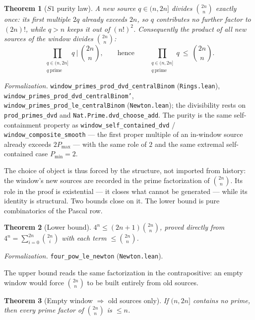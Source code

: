 \documentclass[11pt,a4paper]{amsart}
\theoremstyle{plain}
\newtheorem{theorem}{Theorem}[section]
\theoremstyle{definition}
\theoremstyle{plain}
\theoremstyle{remark}
\newcommand{\lean}[1]{\textup{\texttt{#1}}}
\newcommand{\Formal}[1]{\par\smallskip\noindent\emph{Formalization.} #1\par\smallskip}
\begin{document}
\begin{theorem}[$S1$ purity law]\label{thm:s1}
A new source $q\in(n,2n]$ divides $\binom{2n}{n}$ exactly once: its first multiple $2q$
already exceeds $2n$, so $q$ contributes no further factor to $(2n)!$, while $q>n$ keeps it out
of $(n!)^2$.
Consequently the product of all new sources of the window divides $\binom{2n}{n}$:
\[
\prod_{\substack{q\in(n,2n]\\ q\ \text{prime}}} q \ \Big|\ \binom{2n}{n},
\qquad\text{hence}\qquad
\prod_{\substack{q\in(n,2n]\\ q\ \text{prime}}} q \ \le\ \binom{2n}{n}.
\]
\end{theorem}

\Formal{\lean{window\_primes\_prod\_dvd\_centralBinom} (\lean{Rings.lean}),
\lean{window\_primes\_prod\_dvd\_centralBinom'},
\lean{window\_primes\_prod\_le\_centralBinom} (\lean{Newton.lean}); the
divisibility rests on \lean{prod\_primes\_dvd} and
\lean{Nat.Prime.dvd\_choose\_add}. The purity is the same self-containment property as
\lean{window\_self\_contained\_dvd} / \lean{window\_composite\_smooth} --- the first proper
multiple of an in-window source already exceeds $2P_{\max}$ --- with the same role of $2$ and
the same extremal self-contained case $P_{\min}=2$.}

The choice of object is thus forced by the structure, not imported from history: the window's
new sources are recorded in the prime factorization of $\binom{2n}{n}$. Its role in the proof
is existential --- it closes what cannot be generated --- while its identity is structural.
Two bounds close on it. The lower bound is pure combinatorics of the Pascal row.

\begin{theorem}[Lower bound]\label{thm:lower}
$4^n\le(2n+1)\binom{2n}{n}$, proved directly from
$4^n=\sum_{i=0}^{2n}\binom{2n}{i}$ with each term $\le\binom{2n}{n}$.
\end{theorem}

\Formal{\lean{four\_pow\_le\_newton} (\lean{Newton.lean}).}

The upper bound reads the same factorization in the contrapositive: an empty window would
force $\binom{2n}{n}$ to be built entirely from old sources.

\begin{theorem}[Empty window $\Rightarrow$ old sources only]\label{thm:upper}
If $(n,2n]$ contains no prime, then every prime factor of $\binom{2n}{n}$ is $\le n$.
\end{theorem}
\end{document}
